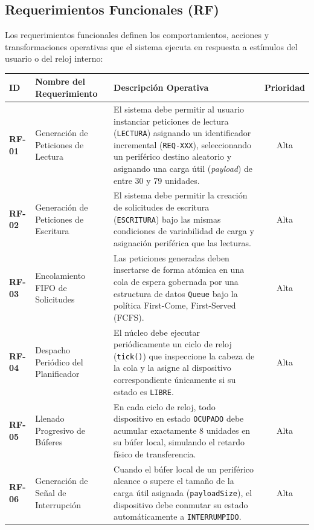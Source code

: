 \documentclass[11pt,letterpaper]{article}
\begin{document}
\subsection{Requerimientos Funcionales (RF)}

Los requerimientos funcionales definen los comportamientos, acciones y transformaciones operativas que el sistema ejecuta en respuesta a estímulos del usuario o del reloj interno:

\begin{table}[htbp]
\centering
\small
\renewcommand{\arraystretch}{1.3}
\begin{tabularx}{\textwidth}{|l|p{4.5cm}|L|c|}
\hline
\textbf{ID} & \textbf{Nombre del Requerimiento} & \textbf{Descripción Operativa} & \textbf{Prioridad} \\ \hline
\textbf{RF-01} & Generación de Peticiones de Lectura & El sistema debe permitir al usuario instanciar peticiones de lectura (\texttt{LECTURA}) asignando un identificador incremental (\texttt{REQ-XXX}), seleccionando un periférico destino aleatorio y asignando una carga útil (\textit{payload}) de entre 30 y 79 unidades. & Alta \\ \hline
\textbf{RF-02} & Generación de Peticiones de Escritura & El sistema debe permitir la creación de solicitudes de escritura (\texttt{ESCRITURA}) bajo las mismas condiciones de variabilidad de carga y asignación periférica que las lecturas. & Alta \\ \hline
\textbf{RF-03} & Encolamiento FIFO de Solicitudes & Las peticiones generadas deben insertarse de forma atómica en una cola de espera gobernada por una estructura de datos \texttt{Queue} bajo la política First-Come, First-Served (FCFS). & Alta \\ \hline
\textbf{RF-04} & Despacho Periódico del Planificador & El núcleo debe ejecutar periódicamente un ciclo de reloj (\texttt{tick()}) que inspeccione la cabeza de la cola y la asigne al dispositivo correspondiente únicamente si su estado es \texttt{LIBRE}. & Alta \\ \hline
\textbf{RF-05} & Llenado Progresivo de Búferes & En cada ciclo de reloj, todo dispositivo en estado \texttt{OCUPADO} debe acumular exactamente 8 unidades en su búfer local, simulando el retardo físico de transferencia. & Alta \\ \hline
\textbf{RF-06} & Generación de Señal de Interrupción & Cuando el búfer local de un periférico alcance o supere el tamaño de la carga útil asignada (\texttt{payloadSize}), el dispositivo debe conmutar su estado automáticamente a \texttt{INTERRUMPIDO}. & Alta \\ \hline

\end{tabularx}
\end{table}
\end{document}
